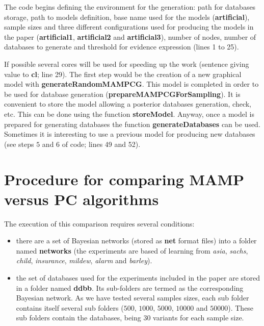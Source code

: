 \documentclass[11pt,professionalfont]{article}
\begin{document}
The code begins defining the environment for the generation: path for
databases storage, path to models definition, base name used for the
models (\textbf{artificial}), sample sizes and three  different configurations 
used for producing the models in the paper  (\textbf{artificial1}, 
\textbf{artificial2} and \textbf{artificial3}),  number of nodes,  
number of databases to generate and threshold for evidence expression (lines 1 
to 25). 

\medskip

If possible several cores will be used for speeding up the work (sentence 
giving value to \textbf{cl}; line 29). The first step would be the creation 
of a new graphical model with \textbf{generateRandomMAMPCG}. This model is
completed in order to be used for database generation (\textbf{prepareMAMPCGForSampling}). 
It is convenient to store the model allowing a posterior databases generation, check, etc. 
This can be done using the function \textbf{storeModel}. Anyway, once a model 
is prepared for generating databases the function \textbf{generateDatabases}
can be used. Sometimes it is interesting to use a previous model for producing 
new databases (see steps $5$ and $6$ of code; lines 49 and 52).

\section{Procedure for comparing MAMP versus PC algorithms}

The execution of this comparison requires several conditions:

\begin{itemize}
\item there are a set of Bayesian networks (stored as \textbf{net} format 
files) into a folder named \textbf{networks} (the experiments are based
of learning from \textit{asia}, \textit{sachs}, \textit{child}, \textit{insurance}, \textit{mildew}, \textit{alarm} and \textit{barley}).

\item the set of databases used for the experiments included in the paper 
are stored in a folder named \textbf{ddbb}. Its sub-folders are termed as 
the corresponding Bayesian network. As we have tested several samples sizes, 
each sub folder contains itself several sub folders ($500$, $1000$, $5000$, 
$10000$ and $50000$). These sub folders contain the databases, being $30$ 
variants for each sample size. 
\end{itemize}
\end{document}
